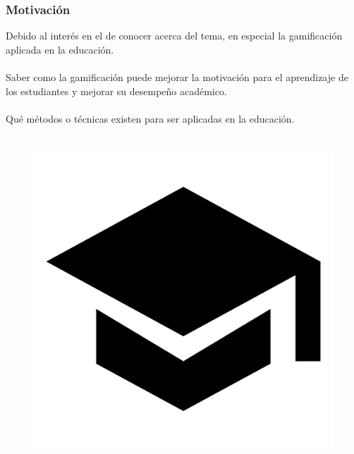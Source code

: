 \documentclass{beamer}
\begin{document}
\begin{frame}
	\frametitle{Motivación}
	Debido al interés en el de conocer acerca del tema, en especial la gamificación aplicada en la educación.	\\~\\
	Saber como la gamificación puede mejorar la motivación para el aprendizaje de los estudiantes y mejorar su desempeño académico.	\\~\\
	Qué métodos o técnicas existen para ser aplicadas en la educación.
	\\~\\
	
	\begin{figure}
		\begin{center}
			\includegraphics[scale=0.1]{images/2icons/student.png}
		\end{center}
	\end{figure}
\end{frame}
\end{document}
